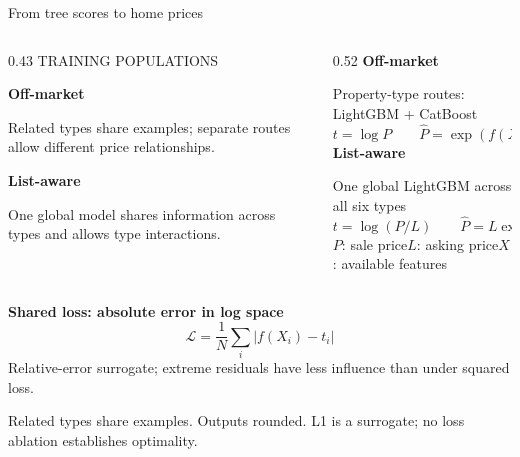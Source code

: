 \documentclass[aspectratio=169,20pt]{beamer}
\newcommand{\smalltext}{\fontsize{15}{19}\selectfont}
\newcommand{\tinytext}{\fontsize{12}{15}\selectfont}
\newcommand{\sourceline}[1]{\par{\tinytext\color{Muted}#1\par}}
\begin{document}
\begin{frame}[t]{From tree scores to home prices}
\relax
\vspace{3mm}
\begin{columns}[T,onlytextwidth]
\begin{column}{0.43\textwidth}
{\color{Muted}\smalltext TRAINING POPULATIONS}\par
\vspace{7mm}
{\color{Blue}\bfseries Off-market}\par
\vspace{3mm}
{\fontsize{18}{23}\selectfont Related types share examples; separate routes allow different price relationships.\par}
\vspace{8mm}
{\color{Teal}\bfseries List-aware}\par
\vspace{3mm}
{\fontsize{18}{23}\selectfont One global model shares information across types and allows type interactions.\par}
\end{column}
\begin{column}{0.52\textwidth}
{\color{Blue}\bfseries Off-market}

\smalltext Property-type routes: LightGBM + CatBoost
\[
 t=\log P \qquad \widehat P=\exp(f(X))
\]
\vspace{4mm}
{\color{Teal}\fontsize{20}{25}\selectfont\bfseries List-aware}

\smalltext One global LightGBM across all six types
\[
 t=\log(P/L) \qquad \widehat P=L\exp(f(X))
\]
\smalltext $P$: sale price\quad $L$: asking price\quad $X$: available features
\end{column}
\end{columns}
\vfill
{\fontsize{21}{26}\selectfont\bfseries Shared loss: absolute error in log space}
\[
\mathcal{L}=\frac1N\sum_i\bigl|f(X_i)-t_i\bigr|
\]
{\smalltext Relative-error surrogate; extreme residuals have less influence than under squared loss.}

\sourceline{Related types share examples. Outputs rounded. L1 is a surrogate; no loss ablation establishes optimality.}
\end{frame}
\end{document}
